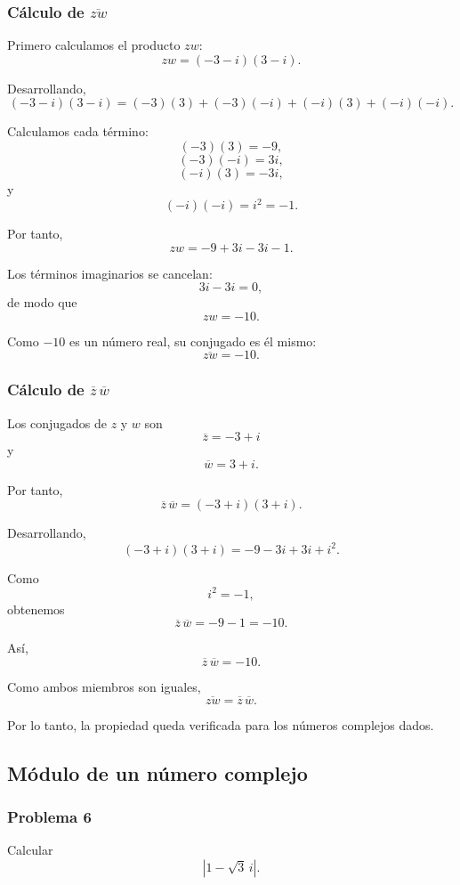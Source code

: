 \subsubsection*{Cálculo de $\overline{zw}$}

Primero calculamos el producto $zw$:
\[
zw=(-3-i)(3-i).
\]

Desarrollando,
\[
(-3-i)(3-i)
=
(-3)(3)+(-3)(-i)+(-i)(3)+(-i)(-i).
\]

Calculamos cada término:
\[
(-3)(3)=-9,
\]
\[
(-3)(-i)=3i,
\]
\[
(-i)(3)=-3i,
\]
y
\[
(-i)(-i)=i^2=-1.
\]

Por tanto,
\[
zw=-9+3i-3i-1.
\]

Los términos imaginarios se cancelan:
\[
3i-3i=0,
\]
de modo que
\[
zw=-10.
\]

Como $-10$ es un número real, su conjugado es él mismo:
\[
\boxed{\overline{zw}=-10}.
\]

\subsubsection*{Cálculo de $\overline z\,\overline w$}

Los conjugados de $z$ y $w$ son
\[
\overline z=-3+i
\]
y
\[
\overline w=3+i.
\]

Por tanto,
\[
\overline z\,\overline w
=
(-3+i)(3+i).
\]

Desarrollando,
\[
(-3+i)(3+i)
=
-9-3i+3i+i^2.
\]

Como
\[
i^2=-1,
\]
obtenemos
\[
\overline z\,\overline w
=
-9-1
=
-10.
\]

Así,
\[
\boxed{\overline z\,\overline w=-10}.
\]

Como ambos miembros son iguales,
\[
\boxed{
\overline{zw}=\overline z\,\overline w
}.
\]

Por lo tanto, la propiedad queda verificada para los números complejos dados.

\subsection{Módulo de un número complejo}

\subsubsection*{Problema 6}

Calcular
\[
\left|1-\sqrt3\,i\right|.
\]

